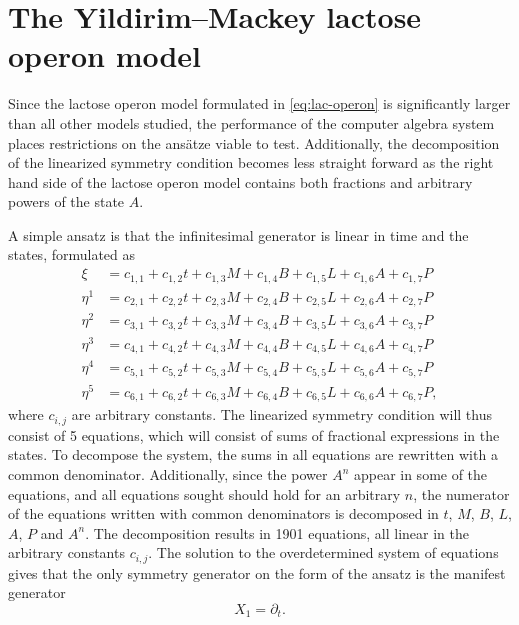 \section{The Yildirim--Mackey lactose operon model} \label{sec:lac-operon-ansatze}

Since the lactose operon model formulated in \cref{eq:lac-operon} is significantly larger than all other models studied, the performance of the computer algebra system places restrictions on the ansätze viable to test.
Additionally, the decomposition of the linearized symmetry condition becomes less straight forward as the right hand side of the lactose operon model contains both fractions and arbitrary powers of the state \(A\).

A simple ansatz is that the infinitesimal generator is linear in time and the states, formulated as
\begin{align*}
  \xi &= c_{1,1} + c_{1,2}t + c_{1,3}M + c_{1,4}B + c_{1,5}L + c_{1,6}A + c_{1,7}P \\
  \eta^{1} &= c_{2,1} + c_{2,2}t + c_{2,3}M + c_{2,4}B + c_{2,5}L + c_{2,6}A + c_{2,7}P \\
  \eta^{2} &= c_{3,1} + c_{3,2}t + c_{3,3}M + c_{3,4}B + c_{3,5}L + c_{3,6}A + c_{3,7}P \\
  \eta^{3} &= c_{4,1} + c_{4,2}t + c_{4,3}M + c_{4,4}B + c_{4,5}L + c_{4,6}A + c_{4,7}P \\
  \eta^{4} &= c_{5,1} + c_{5,2}t + c_{5,3}M + c_{5,4}B + c_{5,5}L + c_{5,6}A + c_{5,7}P \\
  \eta^{5} &= c_{6,1} + c_{6,2}t + c_{6,3}M + c_{6,4}B + c_{6,5}L + c_{6,6}A + c_{6,7}P,
\end{align*}
where  \(c_{i,j}\) are arbitrary constants.
The linearized symmetry condition will thus consist of 5 equations, which will consist of sums of fractional expressions in the states.
To decompose the system, the sums in all equations are rewritten with a common denominator.
Additionally, since the power \(A^n\) appear in some of the equations, and all equations sought should hold for an arbitrary \(n\), the numerator of the equations written with common denominators is decomposed in \(t\), \(M\), \(B\), \(L\), \(A\), \(P\) and \(A^n\).
The decomposition results in 1901 equations, all linear in the arbitrary constants \(c_{i,j}\).
The solution to the overdetermined system of equations gives that the only symmetry generator on the form of the ansatz is the manifest generator
\begin{equation*}
  X_1 = \partial_t.
\end{equation*}
